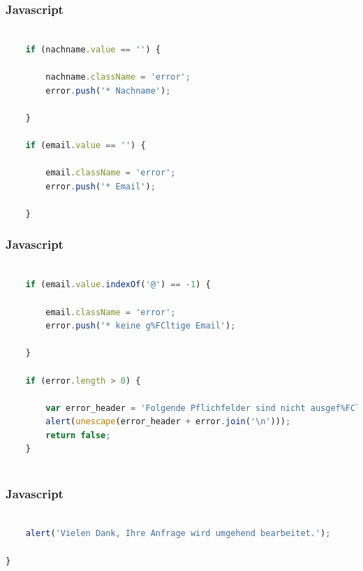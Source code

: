 \documentclass[xcolor=dvipsnames]{beamer}
\begin{document}
\begin{frame}[fragile]
\frametitle{Javascript}

\begin{lstlisting}[language=javascript, firstnumber=28]

	if (nachname.value == '') {

		nachname.className = 'error';
		error.push('* Nachname');

	}

	if (email.value == '') {

		email.className = 'error';
		error.push('* Email');

	}


\end{lstlisting}
\end{frame}

\begin{frame}[fragile]
\frametitle{Javascript}

\begin{lstlisting}[language=javascript, firstnumber=42]

	if (email.value.indexOf('@') == -1) {

		email.className = 'error';
		error.push('* keine g%FCltige Email');

	}

	if (error.length > 0) {

		var error_header = 'Folgende Pflichfelder sind nicht ausgef%FCllt:\n\n';
		alert(unescape(error_header + error.join('\n')));
		return false;
	}
	
\end{lstlisting}
\end{frame}

\begin{frame}[fragile]
\frametitle{Javascript}

\begin{lstlisting}[language=javascript, firstnumber=56]
	
	alert('Vielen Dank, Ihre Anfrage wird umgehend bearbeitet.');

}

\end{lstlisting}
\end{frame}
\end{document}
